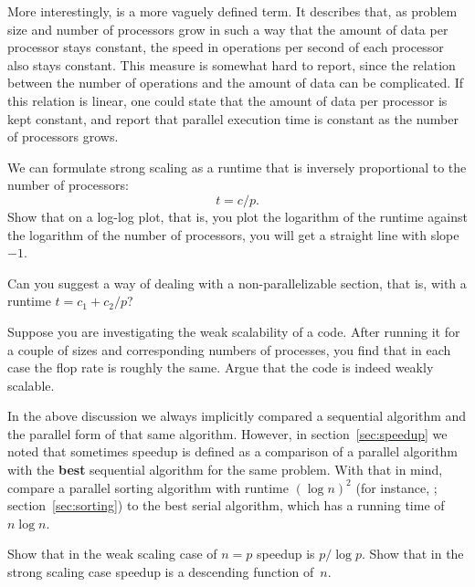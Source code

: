 More interestingly,  is a more vaguely
defined term. It describes that, as problem size and number of
processors grow in such a way that the amount of data per processor
stays constant, the speed in operations per second of each processor
also stays constant. This measure is somewhat hard to report, since
the relation between the number of operations and the amount of data
can be complicated. If this relation is linear, one could state that
the amount of data per processor is kept constant, and report that parallel
execution time is constant as the number of processors grows.

\begin{exercise}
  We can formulate strong scaling as a runtime that is inversely
  proportional to the number of processors: \[ t=c/p. \]
  Show that on a log-log plot, that is, you plot the logarithm of the
  runtime against the logarithm of the number of processors,
  you will get a straight line with slope~$-1$.

  Can you suggest a way of dealing with a non-parallelizable
  section, that is, with a runtime $t=c_1+c_2/p$?
\end{exercise}

\begin{exercise}
  Suppose you are investigating the weak scalability of a code.
  After running it for a couple of sizes and corresponding numbers
  of processes, you find that in each case the flop rate is roughly the same.
  Argue that the code is indeed weakly scalable.
\end{exercise}

\begin{exercise}
  In the above discussion we always implicitly compared a sequential 
  algorithm and the parallel form of that same algorithm. However, 
  in section~\ref{sec:speedup} we noted that sometimes speedup is defined
  as a comparison of a parallel algorithm with the \textbf{best} sequential
  algorithm for the same problem. With that in mind, compare a parallel sorting
  algorithm with runtime $(\log n)^2$ (for instance, ;
  section~\ref{sec:sorting}) to the best serial algorithm, which has 
  a running time of $n\log n$.

  Show that in the weak scaling case of $n=p$ speedup is $p/\log p$.
  Show that in the strong scaling case speedup is a descending function of~$n$.
\end{exercise}


